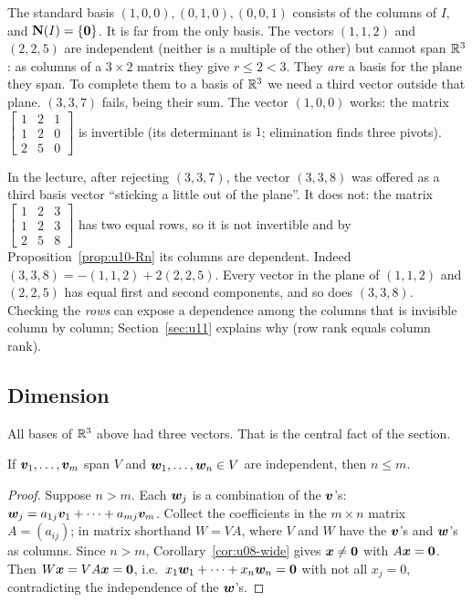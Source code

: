 \begin{example}\label{ex:u10-R3}
The standard basis $(1,0,0),(0,1,0),(0,0,1)$ consists of the columns of $I$, and
$\mathbf{N}(I)=\{\boldsymbol{0}\}$. It is far from the only basis. The vectors $(1,1,2)$ and $(2,2,5)$ are
independent (neither is a multiple of the other) but cannot span $\mathbb{R}^3$: as columns of a $3\times2$
matrix they give $r\le2<3$. They \emph{are} a basis for the plane they span. To complete them to a
basis of $\mathbb{R}^3$ we need a third vector outside that plane. $(3,3,7)$ fails, being their sum. The
vector $(1,0,0)$ works: the matrix $\begin{bmatrix}1&2&1\\1&2&0\\2&5&0\end{bmatrix}$ is invertible
(its determinant is $1$; elimination finds three pivots).
\end{example}

\begin{trap}
In the lecture, after rejecting $(3,3,7)$, the vector $(3,3,8)$ was offered as a third basis vector
``sticking a little out of the plane''. It does not: the matrix
$\begin{bmatrix}1&2&3\\1&2&3\\2&5&8\end{bmatrix}$ has two equal rows, so it is not invertible and by
Proposition~\ref{prop:u10-Rn} its columns are dependent. Indeed $(3,3,8)=-(1,1,2)+2(2,2,5)$. Every
vector in the plane of $(1,1,2)$ and $(2,2,5)$ has equal first and second components, and so does
$(3,3,8)$. Checking the \emph{rows} can expose a dependence among the columns that is invisible
column by column; Section~\ref{sec:u11} explains why (row rank equals column rank).
\end{trap}

\subsection{Dimension}

All bases of $\mathbb{R}^3$ above had three vectors. That is the central fact of the section.

\begin{lemma}\label{lem:u10-count}
If $\boldsymbol{v}_1,\dots,\boldsymbol{v}_m$ span $V$ and $\boldsymbol{w}_1,\dots,\boldsymbol{w}_n\in V$ are independent, then
$n\le m$.
\end{lemma}
\begin{proof}
Suppose $n>m$. Each $\boldsymbol{w}_j$ is a combination of the $\boldsymbol{v}$'s:
$\boldsymbol{w}_j=a_{1j}\boldsymbol{v}_1+\dots+a_{mj}\boldsymbol{v}_m$. Collect the coefficients in the $m\times n$ matrix
$A=(a_{ij})$; in matrix shorthand $W=VA$, where $V$ and $W$ have the $\boldsymbol{v}$'s and $\boldsymbol{w}$'s as
columns. Since $n>m$, Corollary~\ref{cor:u08-wide} gives $\boldsymbol{x}\neq\boldsymbol{0}$ with $A\boldsymbol{x}=\boldsymbol{0}$.
Then $W\boldsymbol{x}=VA\boldsymbol{x}=\boldsymbol{0}$, i.e.\ $x_1\boldsymbol{w}_1+\dots+x_n\boldsymbol{w}_n=\boldsymbol{0}$ with not all $x_j=0$,
contradicting the independence of the $\boldsymbol{w}$'s.
\end{proof}


